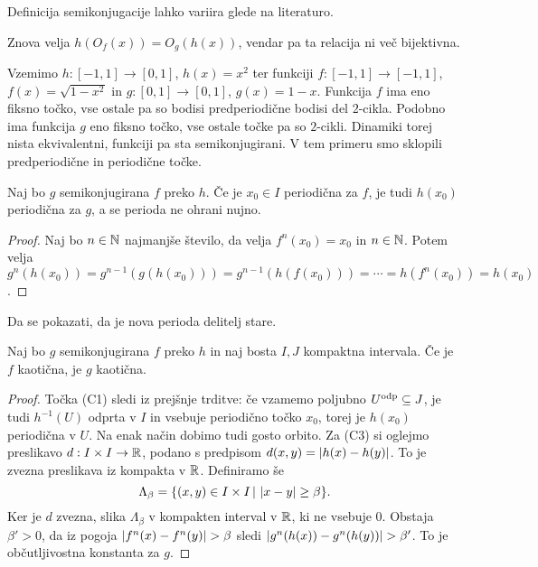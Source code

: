 \begin{opomba}
  Definicija semikonjugacije lahko variira glede na literaturo.
\end{opomba}

\begin{opomba}
  Znova velja $h(O_f(x)) = O_g(h(x))$, vendar pa ta relacija ni več bijektivna.
\end{opomba}

\begin{primer}
  Vzemimo $h: [-1,1] \to [0,1]$, $h(x) = x^2$ ter funkciji $f: [-1, 1] \to [-1,
  1]$, $f(x) = \sqrt{1-x^2}$ in $g:[0,1] \to [0,1]$, $g(x) = 1-x$.
  Funkcija $f$ ima eno fiksno točko, vse ostale pa so bodisi predperiodične
  bodisi del $2$-cikla.
  Podobno ima funkcija $g$ eno fiksno točko, vse ostale točke pa so $2$-cikli.
  Dinamiki torej nista ekvivalentni, funkciji pa sta semikonjugirani.
  V tem primeru smo sklopili predperiodične in periodične točke.
\end{primer}

\begin{trditev}
  Naj bo $g$ semikonjugirana $f$ preko $h$.
  Če je $x_0 \in I$ periodična za $f$, je tudi $h(x_0)$ periodična za $g$, a se
  perioda ne ohrani nujno.
\end{trditev}

\begin{proof}
  Naj bo $n \in \mathbb{N}$ najmanjše število, da velja $f^n(x_0) = x_0$ in $n \in \mathbb{N}$.
  Potem velja $g^n(h(x_0)) = g^{n-1}(g(h(x_0))) = g^{n-1}(h(f(x_0))) = \cdots =
  h(f^n(x_0)) = h(x_0)$.
\end{proof}

\begin{opomba}
  Da se pokazati, da je nova perioda delitelj stare.
\end{opomba}

\begin{izrek}
  Naj bo $g$ semikonjugirana $f$ preko $h$ in naj bosta $I,J$ kompaktna
  intervala.
  Če je $f$ kaotična, je $g$ kaotična.
\end{izrek}

\begin{proof}
  Točka (C1) sledi iz prejšnje trditve: če vzamemo poljubno $U ^\text{\normalfont odp}\subseteq J$, je tudi
  $h^{-1}(U)$ odprta v $I$ in vsebuje periodično točko $x_0$, torej je $h(x_0)$
  periodična v $U$.
  Na enak način dobimo tudi gosto orbito.
  Za (C3) si oglejmo preslikavo $d: I \times I \to \mathbb{R}$, podano s predpisom
  $d(x,y) = \left| h(x) - h(y) \right|$.
  To je zvezna preslikava iz kompakta v $\mathbb{R}$.
  Definiramo še
  \[
	\Lambda_\beta = \{ (x,y) \in I \times I \,|\, \left| x-y \right| \ge \beta \}.
  \]
  Ker je $d$ zvezna, slika $\Lambda_\beta$ v kompakten interval v $\mathbb{R}$, ki ne
  vsebuje $0$.
  Obstaja $\beta' > 0$, da iz pogoja $\left| f^n(x) - f^n(y) \right| > \beta$ sledi
  $\left| g^n(h(x)) - g^n(h(y)) \right| > \beta'$.
  To je občutljivostna konstanta za $g$.
\end{proof}

